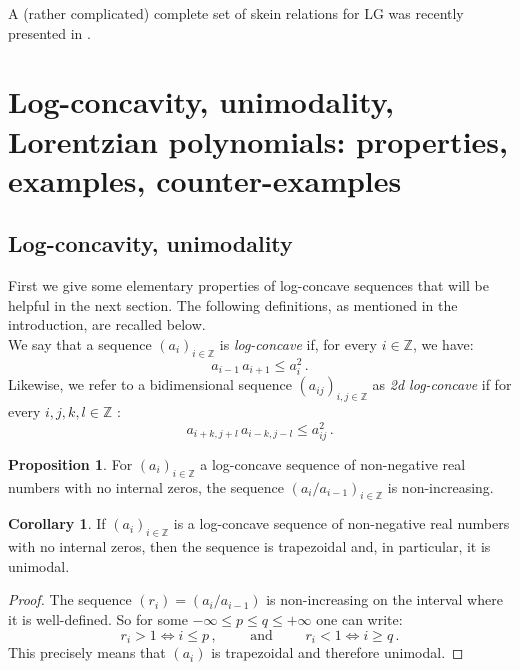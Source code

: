 \documentclass[12pt,reqno]{amsart}
\theoremstyle{definition}
\newtheorem{proposition}[theorem]{Proposition}
\newtheorem{corollary}[theorem]{Corollary}
\def\LG{\mathrm{LG}}
\begin{document}
A (rather complicated) complete set of skein relations for $\LG$ was recently presented in \cite{GHKKST}.



\section{Log-concavity, unimodality, Lorentzian polynomials: properties, examples, counter-examples}\label{sec:logconcave}

\subsection{Log-concavity, unimodality}

First we give some elementary properties of log-concave sequences that will be helpful in the next section. The following definitions, as mentioned in the introduction, are recalled below. \\

We say that a sequence $(a_{i})_{i \in \mathbb{Z}}$ is \emph{log-concave} if, for every \( i \in \mathbb{Z} \), we have: $$a_{i-1} \, a_{i+1} \leq a_i^2\,.$$
Likewise, we refer to a bidimensional sequence $(a_{ij})_{i,j \in \mathbb{Z}}$ as \emph{2d log-concave} if for every $i,j,k,l \in \mathbb{Z}$ :
   $$a_{i+k,j+l} \, a_{i-k,j-l} \leq a_{ij}^2\,.$$

\begin{proposition}
    For $(a_{i})_{i \in \mathbb{Z}}$ a log-concave sequence of non-negative real numbers with no internal zeros, the sequence $(a_i/a_{i-1})_{i \in \mathbb{Z}}$ is non-increasing.
\end{proposition}   

\begin{corollary}\label{cor.logconcave}
    If $(a_{i})_{i \in \mathbb{Z}}$ is a log-concave sequence of non-negative real numbers with no internal zeros, then the sequence is trapezoidal and, in particular, it is unimodal.
\end{corollary}

\begin{proof}
   The sequence $(r_i) = (a_i/a_{i-1})$ is non-increasing on the interval where it is well-defined. So for some $-\infty \leq p \leq q \leq + \infty$ one can write: 
   $$
      r_i > 1  \iff i \leq p\,, \qquad \text{ and } \qquad r_i < 1  \iff i \geq q\,.
  $$ 
This precisely means that $(a_{i})$ is trapezoidal and therefore unimodal.
\end{proof}
\end{document}
